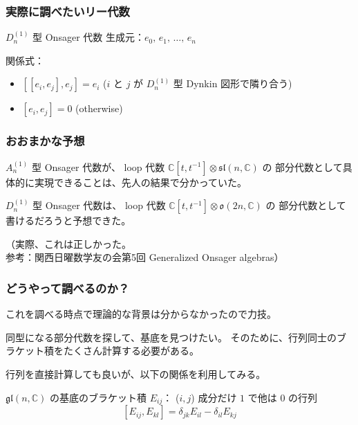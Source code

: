\documentclass{beamer}
\begin{document}
\begin{frame}
    \frametitle{実際に調べたいリー代数}

    \begin{block}{\(D_n^{(1)}\) 型 Onsager 代数}
        生成元：\(e_0,\, e_1,\, \dots,\, e_n\)

        関係式：
        \begin{itemize}
            \item \([[e_i, e_j], e_j] = e_i\) (\(i\) と \(j\) が \(D_n^{(1)}\) 型 Dynkin 図形で隣り合う)
            \item \([e_i, e_j] = 0\) (otherwise)
        \end{itemize}
    \end{block}

\end{frame}

\begin{frame}
    \frametitle{おおまかな予想}

    \(A_n^{(1)}\) 型 Onsager 代数が、
    loop 代数 \(\mathbb{C}[t,t^{-1}] \otimes \mathfrak{sl}(n,\mathbb{C})\) の
    部分代数として具体的に実現できることは、先人の結果で分かっていた。

    \(D_n^{(1)}\) 型 Onsager 代数は、
    loop 代数 \(\mathbb{C}[t,t^{-1}] \otimes \mathfrak{o}(2n,\mathbb{C})\) の
    部分代数として書けるだろうと予想できた。

    \bigskip

    （実際、これは正しかった。\\
    参考：関西日曜数学友の会第5回 Generalized Onsager algebras）
\end{frame}

\begin{frame}
    \frametitle{どうやって調べるのか？}

    これを調べる時点で理論的な背景は分からなかったので力技。

    同型になる部分代数を探して、基底を見つけたい。
    そのために、行列同士のブラケット積をたくさん計算する必要がある。

    行列を直接計算しても良いが、以下の関係を利用してみる。

    \begin{block}{\(\mathfrak{gl}(n,\mathbb{C})\) の基底のブラケット積}
        \(E_{ij}\)： (\(i,j\)) 成分だけ \(1\) で他は \(0\) の行列
        \[
            [E_{ij}, E_{kl}] = \delta_{jk}E_{il} - \delta_{il}E_{kj}
        \]
    \end{block}
\end{frame}
\end{document}
